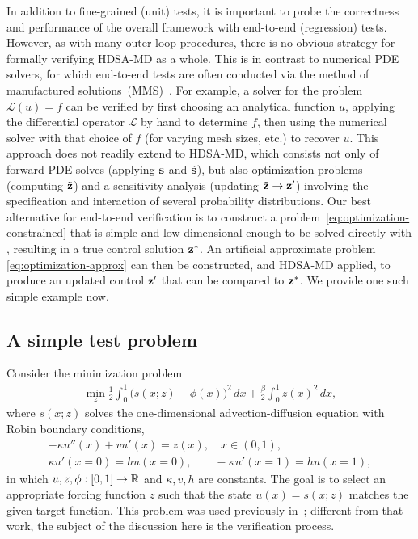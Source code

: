 In addition to fine-grained (unit) tests, it is important to probe the correctness and performance of the overall framework with end-to-end (regression) tests.
However, as with many outer-loop procedures, there is no obvious strategy for formally verifying HDSA-MD as a whole.
This is in contrast to numerical PDE solvers, for which end-to-end tests are often conducted via the method of manufactured solutions~(MMS)~\cite{roache2001manufacturedsolutions}.
For example, a solver for the problem $\mathcal{L}(u) = f$ can be verified by first choosing an analytical function $u$, applying the differential operator $\mathcal{L}$ by hand to determine $f$, then using the numerical solver with that choice of $f$ (for varying mesh sizes, etc.) to recover $u$.
This approach does not readily extend to HDSA-MD, which consists not only of forward PDE solves (applying $\mathbf{s}$ and $\tilde{\mathbf{s}}$), but also optimization problems (computing $\tilde{\mathbf{z}}$) and a sensitivity analysis (updating $\tilde{\mathbf{z}} \to \mathbf{z}'$) involving the specification and interaction of several probability distributions.
Our best alternative for end-to-end verification is to construct a problem~\cref{eq:optimization-constrained} that is simple and low-dimensional enough to be solved directly with , resulting in a true control solution $\mathbf{z}^{*}$.
An artificial approximate problem \cref{eq:optimization-approx} can then be constructed, and HDSA-MD applied, to produce an updated control $\mathbf{z}'$ that can be compared to $\mathbf{z}^{*}$.
We provide one such simple example now.

\subsection{A simple test problem}
\label{sec:smallexample}

Consider the minimization problem
\begin{align}
    \label{eq:advection-diffusion-continuous-objective}
    \min_{z} \frac{1}{2}\int_{0}^{1}\big(
        s(x;z) - \phi(x)
    \big)^2\,dx
    + \frac{\beta}{2}\int_{0}^{1}z(x)^2\,dx,
\end{align}
where $s(x;z)$ solves the one-dimensional advection-diffusion equation with Robin boundary conditions,
\begin{subequations}\label{eq:advection-diffusion}
\begin{gather}
\label{eq:advection-diffusion-dynamics}
-\kappa u''(x) + v u'(x) = z(x),
\quad x\in(0, 1),
\\
\label{eq:advection-diffusion-boundaries}
\kappa u'(x=0) = h u(x=0),
\qquad
-\kappa u'(x=1) = h u(x=1),
\end{gather}
\end{subequations}
in which $u,z,\phi:[0,1]\to\mathbb{R}$ and $\kappa, v, h$ are constants.
The goal is to select an appropriate forcing function $z$ such that the state $u(x) = s(x;z)$ matches the given target function.
This problem was used previously in~\cite{hart2025hdsaposterior}; different from that work, the subject of the discussion here is the verification process.

